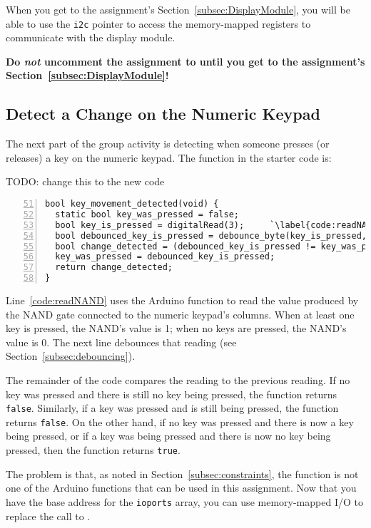 When you get to the assignment's Section~\ref{subsec:DisplayModule}, you will be able to use the \lstinline{i2c} pointer to access the memory-mapped registers to communicate with the display module.

\textbf{Do \textit{not} uncomment the assignment to  until you get to the assignment's Section~\ref{subsec:DisplayModule}!}


\subsection{Detect a Change on the Numeric Keypad} \label{subsec:detectKeyAction}

The next part of the group activity is detecting when someone presses (or releases) a key on the numeric keypad.
The  function in the starter code is:

{\color{red}TODO: change this to the new code}

\begin{lstlisting}[numberstyle=\color{gray}, numbers=left, firstnumber=51, escapechar=`]
bool key_movement_detected(void) {
  static bool key_was_pressed = false;
  bool key_is_pressed = digitalRead(3);     `\label{code:readNAND}`
  bool debounced_key_is_pressed = debounce_byte(key_is_pressed, KEYPAD);
  bool change_detected = (debounced_key_is_pressed != key_was_pressed);
  key_was_pressed = debounced_key_is_pressed;
  return change_detected;
}
\end{lstlisting}

Line~\ref{code:readNAND} uses the Arduino function  to read the value produced by the NAND gate connected to the numeric keypad's columns.
When at least one key is pressed, the NAND's value is 1;
when no keys are pressed, the NAND's value is 0.
The next line debounces that reading (see Section~\ref{subsec:debouncing}).

The remainder of the code compares the reading to the previous reading.
If no key was pressed and there is still no key being pressed, the function returns \lstinline{false}.
Similarly, if a key was pressed and is still being pressed, the function returns \lstinline{false}.
On the other hand, if no key was pressed and there is now a key being pressed, or if a key was being pressed and there is now no key being pressed, then the function returns \lstinline{true}.

The problem is that, as noted in Section~\ref{subsec:constraints}, the  function is not one of the Arduino functions that can be used in this assignment.
Now that you have the base address for the \lstinline{ioports} array, you can use memory-mapped I/O to replace the call to .

